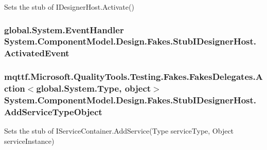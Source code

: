 Sets the stub of I\-Designer\-Host.\-Activate()

\hypertarget{class_system_1_1_component_model_1_1_design_1_1_fakes_1_1_stub_i_designer_host_a1c2ba542209a0167c65a2f90d02c1706}{
\subsubsection[{Activated\-Event}]{\setlength{\rightskip}{0pt plus 5cm}global.\-System.\-Event\-Handler System.\-Component\-Model.\-Design.\-Fakes.\-Stub\-I\-Designer\-Host.\-Activated\-Event}}\label{class_system_1_1_component_model_1_1_design_1_1_fakes_1_1_stub_i_designer_host_a1c2ba542209a0167c65a2f90d02c1706}
\hypertarget{class_system_1_1_component_model_1_1_design_1_1_fakes_1_1_stub_i_designer_host_a70b9970b06f382a4d821ebd2e800f649}{
\subsubsection[{Add\-Service\-Type\-Object}]{\setlength{\rightskip}{0pt plus 5cm}mqttf.\-Microsoft.\-Quality\-Tools.\-Testing.\-Fakes.\-Fakes\-Delegates.\-Action$<$global.\-System.\-Type, object$>$ System.\-Component\-Model.\-Design.\-Fakes.\-Stub\-I\-Designer\-Host.\-Add\-Service\-Type\-Object}}\label{class_system_1_1_component_model_1_1_design_1_1_fakes_1_1_stub_i_designer_host_a70b9970b06f382a4d821ebd2e800f649}


Sets the stub of I\-Service\-Container.\-Add\-Service(\-Type service\-Type, Object service\-Instance)

